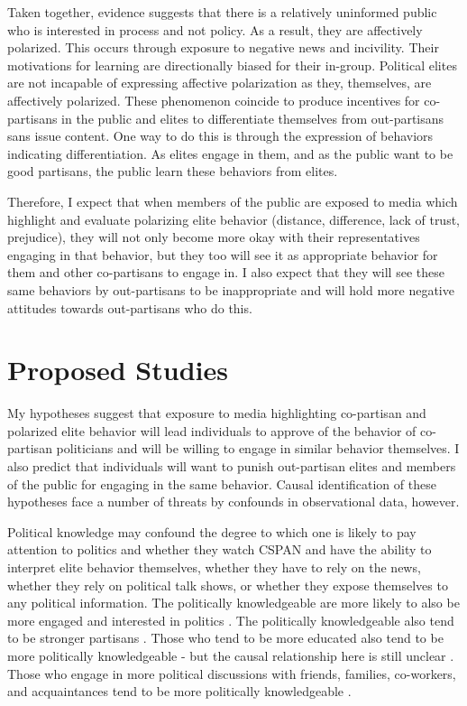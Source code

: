\documentclass [12pt]{article}
\begin{document}
Taken together, evidence suggests that there is a relatively uninformed public who is interested in process and not policy. As a result, they are affectively polarized. This occurs through exposure to negative news and incivility. Their motivations for learning are directionally biased for their in-group. Political elites are not incapable of expressing affective polarization as they, themselves, are affectively polarized. These phenomenon coincide to produce incentives for co-partisans in the public and elites to differentiate themselves from out-partisans sans issue content. One way to do this is through the expression of behaviors indicating differentiation. As elites engage in them, and as the public want to be good partisans, the public learn these behaviors from elites.

Therefore, I expect that when members of the public are exposed to media which highlight and evaluate polarizing elite behavior (distance, difference, lack of trust, prejudice), they will not only become more okay with their representatives engaging in that behavior, but they too will see it as appropriate behavior for them and other co-partisans to engage in. I also expect that they will see these same behaviors by out-partisans to be inappropriate and will hold more negative attitudes towards out-partisans who do this.

\section{Proposed Studies}

My hypotheses suggest that exposure to media highlighting co-partisan and polarized elite behavior will lead individuals to approve of the behavior of co-partisan politicians and will be willing to engage in similar behavior themselves. I also predict that individuals will want to punish out-partisan elites and members of the public for engaging in the same behavior. Causal identification of these hypotheses face a number of threats by confounds in observational data, however. 

Political knowledge may confound the degree to which one is likely to pay attention to politics and whether they watch CSPAN and have the ability to interpret elite behavior themselves, whether they have to rely on the news, whether they rely on political talk shows, or whether they expose themselves to any political information. The politically knowledgeable are more likely to also be more engaged and interested in politics \citep[see][]{delli-carpini_keeter_1996}. The politically knowledgeable also tend to be stronger partisans \citep{zaller_1992, taber_lodge_2006}. Those who tend to be more educated also tend to be more politically knowledgeable - but the causal relationship here is still unclear \citep{highton_2009}. Those who engage in more political discussions with friends, families, co-workers, and acquaintances tend to be more politically knowledgeable \citep{ognyanova_2020}. 
\end{document}
